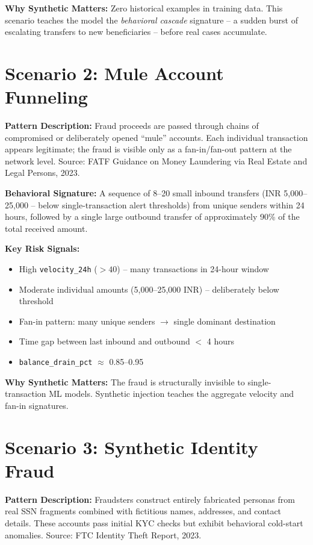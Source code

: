 \documentclass[12pt,a4paper,oneside]{book}
\begin{document}
\textbf{Why Synthetic Matters:} Zero historical examples in training data. This scenario teaches the model the \textit{behavioral cascade} signature -- a sudden burst of escalating transfers to new beneficiaries -- before real cases accumulate.

\section{Scenario 2: Mule Account Funneling}

\textbf{Pattern Description:} Fraud proceeds are passed through chains of compromised or deliberately opened ``mule'' accounts. Each individual transaction appears legitimate; the fraud is visible only as a fan-in/fan-out pattern at the network level. Source: FATF Guidance on Money Laundering via Real Estate and Legal Persons, 2023.

\textbf{Behavioral Signature:} A sequence of 8--20 small inbound transfers (INR 5,000--25,000 -- below single-transaction alert thresholds) from unique senders within 24 hours, followed by a single large outbound transfer of approximately 90\% of the total received amount.

\textbf{Key Risk Signals:}
\begin{itemize}
    \item High \texttt{velocity\_24h} ($>40$) -- many transactions in 24-hour window
    \item Moderate individual amounts (5,000--25,000 INR) -- deliberately below threshold
    \item Fan-in pattern: many unique senders $\rightarrow$ single dominant destination
    \item Time gap between last inbound and outbound $<$ 4 hours
    \item \texttt{balance\_drain\_pct} $\approx$ 0.85--0.95
\end{itemize}

\textbf{Why Synthetic Matters:} The fraud is structurally invisible to single-transaction ML models. Synthetic injection teaches the aggregate velocity and fan-in signatures.

\section{Scenario 3: Synthetic Identity Fraud}

\textbf{Pattern Description:} Fraudsters construct entirely fabricated personas from real SSN fragments combined with fictitious names, addresses, and contact details. These accounts pass initial KYC checks but exhibit behavioral cold-start anomalies. Source: FTC Identity Theft Report, 2023.
\end{document}
